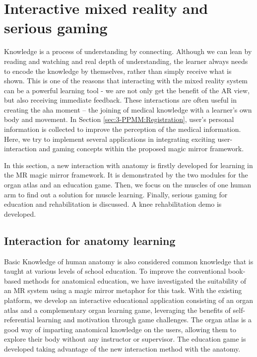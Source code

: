 
\section{Interactive mixed reality and serious gaming} \label{sec:3-PPMM:IMR}
Knowledge is a process of understanding by connecting. Although we can lean by reading and watching and real depth of understanding, the learner always needs to encode the knowledge by themselves, rather than simply receive what is shown. This is one of the reasons that interacting with the mixed reality system can be a powerful learning tool - we are not only get the benefit of the AR view, but also receiving immediate feedback. These interactions are often useful in creating the aha moment -- the joining of medical knowledge with a learner's own body and movement.
In Section \ref{sec:3-PPMM:Registration}, user's personal information is collected to improve the perception of the medical information.
Here, we try to implement several applications in integrating exciting user-interaction and gaming concepts within the proposed magic mirror framework.
 
In this section, a new interaction with anatomy is firstly developed for learning in the MR magic mirror framework. It is demonstrated by the two modules for the organ atlas and an education game.
Then, we focus on the muscles of one human arm to find out a solution for muscle learning. 
Finally, serious gaming for education and rehabilitation is discussed. A knee rehabilitation demo is developed. 

\subsection{Interaction for anatomy learning} \label{sec:3-IMR:anatomyLearning}
Basic Knowledge of human anatomy is also considered common knowledge that is taught at various levels of school education. To improve the conventional book-based methods for anatomical education, we have investigated the suitability of an MR system using a magic mirror metaphor for this task.
With the existing platform, we develop an interactive educational application consisting of an organ atlas and a complementary organ learning game, leveraging the benefits of self-referential learning and motivation through game challenges.
The organ atlas is a good way of imparting anatomical knowledge on the users, allowing them to explore their body without any instructor or supervisor.  The education game is developed taking advantage of the new interaction method with the anatomy. 

